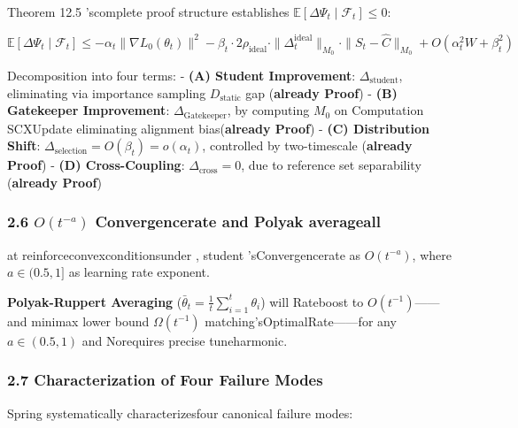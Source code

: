 \documentclass[
  12pt,
]{article}
\begin{document}
Theorem 12.5 'scomplete proof structure establishes
\(\mathbb{E}[\Delta\Psi_t \mid \mathcal{F}_t] \leq 0\): 

\[\mathbb{E}[\Delta\Psi_t \mid \mathcal{F}_t] \leq -\alpha_t \|\nabla L_0(\theta_t)\|^2 - \beta_t \cdot 2\rho_{\text{ideal}} \cdot \|\Delta_t^{\text{ideal}}\|_{M_0} \cdot \|S_t - \hat{C}\|_{M_0} + O(\alpha_t^2 W + \beta_t^2)\]

Decomposition into four terms: - \textbf{(A) Student Improvement}:
\(\Delta_{\text{student}}\), eliminating via importance sampling \(D_{\text{static}}\)
gap (\textbf{already Proof}) - \textbf{(B) Gatekeeper Improvement}:
\(\Delta_{\text{Gatekeeper}}\), by computing \(M_0\) on Computation SCXUpdate
eliminating alignment bias(\textbf{already Proof}) - \textbf{(C) Distribution Shift}:
\(\Delta_{\text{selection}} = O(\beta_t) = o(\alpha_t)\), controlled by two-timescale (\textbf{already Proof})
- \textbf{(D) Cross-Coupling}:
\(\Delta_{\text{cross}} = 0\), due to reference set separability (\textbf{already Proof})

\subsubsection{\texorpdfstring{2.6 \(O(t^{-a})\) Convergencerate and  Polyak
averageall }{2.6 O(t\^{}\{-a\}) Convergencerate and  Polyak all }}\label{ot-a-ux6536ux655bux7387ux4e0e-polyak-ux5e73ux5747}

at reinforceconvexconditionsunder , student 'sConvergencerate as  \(O(t^{-a})\), where \(a \in (0.5, 1]\)
as learning rate exponent. 

\textbf{Polyak-Ruppert Averaging}
(\(\bar{\theta}_t = \frac{1}{t}\sum_{i=1}^t \theta_i\)) will Rateboost to 
\(O(t^{-1})\)------and  minimax lower bound \(\Omega(t^{-1})\)
matching'sOptimalRate------for any \(a \in (0.5, 1)\) and Norequires precise tuneharmonic. 

\subsubsection{2.7
Characterization of Four Failure Modes}\label{ux56dbux79cdux5931ux6548ux6a21ux5f0fux523bux753b}

Spring systematically characterizesfour canonical failure modes: 
\end{document}
